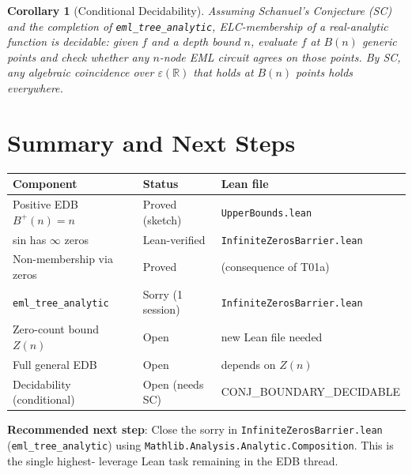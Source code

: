 \documentclass[12pt]{article}
\newtheorem{corollary}[theorem]{Corollary}
\theoremstyle{definition}
\begin{document}
\begin{corollary}[Conditional Decidability]
Assuming Schanuel's Conjecture (SC) and the completion of
\texttt{eml\_tree\_analytic}, ELC-membership of a real-analytic function is
decidable: given $f$ and a depth bound $n$, evaluate $f$ at $B(n)$ generic
points and check whether any $n$-node EML circuit agrees on those points.
By SC, any algebraic coincidence over $\varepsilon(\mathbb{R})$ that holds at
$B(n)$ points holds everywhere.
\end{corollary}

\section{Summary and Next Steps}

\begin{center}
\begin{tabular}{lll}
\toprule
Component & Status & Lean file \\
\midrule
Positive EDB $B^+(n) = n$ & Proved (sketch) & \texttt{UpperBounds.lean} \\
sin has $\infty$ zeros & Lean-verified & \texttt{InfiniteZerosBarrier.lean} \\
Non-membership via zeros & Proved & (consequence of T01a) \\
\texttt{eml\_tree\_analytic} & Sorry (1 session) & \texttt{InfiniteZerosBarrier.lean} \\
Zero-count bound $Z(n)$ & Open & new Lean file needed \\
Full general EDB & Open & depends on $Z(n)$ \\
Decidability (conditional) & Open (needs SC) & CONJ\_BOUNDARY\_DECIDABLE \\
\bottomrule
\end{tabular}
\end{center}

\textbf{Recommended next step}: Close the sorry in
\texttt{InfiniteZerosBarrier.lean} (\texttt{eml\_tree\_analytic}) using
\texttt{Mathlib.Analysis.Analytic.Composition}.  This is the single highest-
leverage Lean task remaining in the EDB thread.
\end{document}
